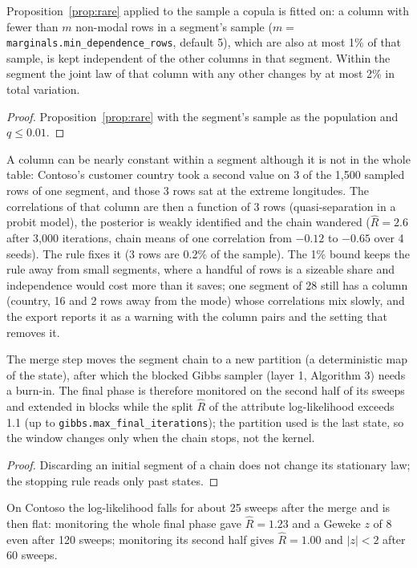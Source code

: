 \begin{proposition}\label{prop:raresample}
Proposition~\ref{prop:rare} applied to the sample a copula is fitted on: a column with fewer than $m$ non-modal rows in a segment's sample ($m=$\texttt{marginals.min\_dependence\_rows}, default 5), which are also at most 1\% of that sample, is kept independent of the other columns in that segment. Within the segment the joint law of that column with any other changes by at most 2\% in total variation.
\end{proposition}
\begin{proof}
Proposition~\ref{prop:rare} with the segment's sample as the population and $q\le0.01$.
\end{proof}
\noindent A column can be nearly constant within a segment although it is not in the whole table: Contoso's customer country took a second value on 3 of the 1{,}500 sampled rows of one segment, and those 3 rows sat at the extreme longitudes. The correlations of that column are then a function of 3 rows (quasi-separation in a probit model), the posterior is weakly identified and the chain wandered ($\hat R=2.6$ after 3{,}000 iterations, chain means of one correlation from $-0.12$ to $-0.65$ over 4 seeds). The rule fixes it (3 rows are 0.2\% of the sample). The 1\% bound keeps the rule away from small segments, where a handful of rows is a sizeable share and independence would cost more than it saves; one segment of 28 still has a column (country, 16 and 2 rows away from the mode) whose correlations mix slowly, and the export reports it as a warning with the column pairs and the setting that removes it.

\begin{proposition}\label{prop:mergeburn}
The merge step moves the segment chain to a new partition (a deterministic map of the state), after which the blocked Gibbs sampler (layer 1, Algorithm 3) needs a burn-in. The final phase is therefore monitored on the second half of its sweeps and extended in blocks while the split $\hat R$ of the attribute log-likelihood exceeds 1.1 (up to \texttt{gibbs.max\_final\_iterations}); the partition used is the last state, so the window changes only when the chain stops, not the kernel.
\end{proposition}
\begin{proof}
Discarding an initial segment of a chain does not change its stationary law; the stopping rule reads only past states.
\end{proof}
\noindent On Contoso the log-likelihood falls for about 25 sweeps after the merge and is then flat: monitoring the whole final phase gave $\hat R=1.23$ and a Geweke $z$ of 8 even after 120 sweeps; monitoring its second half gives $\hat R=1.00$ and $|z|<2$ after 60 sweeps.


